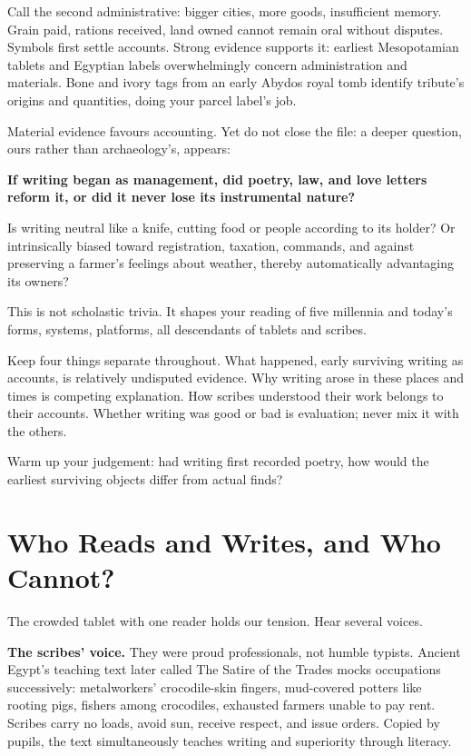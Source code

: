 Call the second administrative: bigger cities, more goods, insufficient memory. Grain paid, rations received, land owned cannot remain oral without disputes. Symbols first settle accounts. Strong evidence supports it: earliest Mesopotamian tablets and Egyptian labels overwhelmingly concern administration and materials. Bone and ivory tags from an early Abydos royal tomb identify tribute's origins and quantities, doing your parcel label's job.

Material evidence favours accounting. Yet do not close the file: a deeper question, ours rather than archaeology's, appears:

\textbf{If writing began as management, did poetry, law, and love letters reform it, or did it never lose its instrumental nature?}

Is writing neutral like a knife, cutting food or people according to its holder? Or intrinsically biased toward registration, taxation, commands, and against preserving a farmer's feelings about weather, thereby automatically advantaging its owners?

This is not scholastic trivia. It shapes your reading of five millennia and today's forms, systems, platforms, all descendants of tablets and scribes.

Keep four things separate throughout. What happened, early surviving writing as accounts, is relatively undisputed evidence. Why writing arose in these places and times is competing explanation. How scribes understood their work belongs to their accounts. Whether writing was good or bad is evaluation; never mix it with the others.

Warm up your judgement: had writing first recorded poetry, how would the earliest surviving objects differ from actual finds?

\section{Who Reads and Writes, and Who Cannot?}
The crowded tablet with one reader holds our tension. Hear several voices.

\textbf{The scribes' voice.} They were proud professionals, not humble typists. Ancient Egypt's teaching text later called The Satire of the Trades mocks occupations successively: metalworkers' crocodile-skin fingers, mud-covered potters like rooting pigs, fishers among crocodiles, exhausted farmers unable to pay rent. Scribes carry no loads, avoid sun, receive respect, and issue orders. Copied by pupils, the text simultaneously teaches writing and superiority through literacy.

